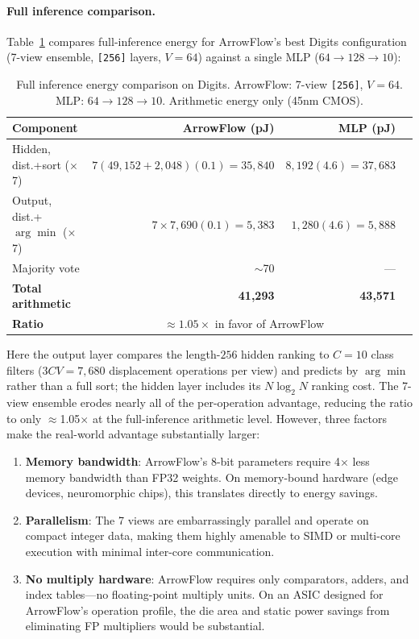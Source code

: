 \documentclass[12pt]{article}
\begin{document}
\paragraph{Full inference comparison.}
Table~\ref{tab:energy-full} compares full-inference energy for ArrowFlow's best Digits configuration (7-view ensemble, \texttt{[256]} layers, $V = 64$) against a single MLP ($64 \to 128 \to 10$):

\begin{table}[ht]
\centering
\caption{Full inference energy comparison on Digits. ArrowFlow: 7-view \texttt{[256]}, $V{=}64$. MLP: $64{\to}128{\to}10$. Arithmetic energy only (45nm CMOS).}
\label{tab:energy-full}
\small
\begin{tabular}{lrrr}
\toprule
Component & ArrowFlow (pJ) & MLP (pJ) \\
\midrule
Hidden, dist.+sort ($\times$7) & $7 (49{,}152{+}2{,}048)(0.1) = 35{,}840$ & $8{,}192 (4.6) = 37{,}683$ \\
Output, dist.+$\arg\min$ ($\times$7) & $7 \times 7{,}690 (0.1) = 5{,}383$ & $1{,}280 (4.6) = 5{,}888$ \\
Majority vote & $\sim$70  & --- \\
\midrule
\textbf{Total arithmetic} & \textbf{41,293} & \textbf{43,571} \\
\textbf{Ratio} & \multicolumn{2}{c}{$\approx 1.05\times$ in favor of ArrowFlow} \\
\bottomrule
\end{tabular}
\end{table}

Here the output layer compares the length-$256$ hidden ranking to $C=10$ class filters ($3CV=7{,}680$ displacement operations per view) and predicts by $\arg\min$ rather than a full sort; the hidden layer includes its $N\log_2 N$ ranking cost. The 7-view ensemble erodes nearly all of the per-operation advantage, reducing the ratio to only $\approx$1.05$\times$ at the full-inference arithmetic level. However, three factors make the real-world advantage substantially larger:
\begin{enumerate}[leftmargin=2em]
  \item \textbf{Memory bandwidth}: ArrowFlow's 8-bit parameters require 4$\times$ less memory bandwidth than FP32 weights. On memory-bound hardware (edge devices, neuromorphic chips), this translates directly to energy savings.
  \item \textbf{Parallelism}: The 7 views are embarrassingly parallel and operate on compact integer data, making them highly amenable to SIMD or multi-core execution with minimal inter-core communication.
  \item \textbf{No multiply hardware}: ArrowFlow requires only comparators, adders, and index tables---no floating-point multiply units. On an ASIC designed for ArrowFlow's operation profile, the die area and static power savings from eliminating FP multipliers would be substantial.
\end{enumerate}
\end{document}
